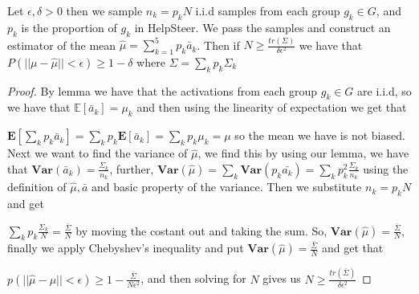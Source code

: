 \begin{theorem}
Let $\epsilon, \delta > 0$ then we sample $n_k=p_k N$ i.i.d samples from each group $g_k \in G$, and $p_k$
is the proportion of $g_k$ in HelpSteer. We pass the samples and construct an estimator of the mean
$\hat{ \mu}=\sum_{k=1}^{5}p_k \bar{a} _k$. Then if $N \geq \frac{tr(\Sigma)}{\delta \epsilon ^2}$ we have that
$P(||\mu - \hat{\mu}|| < \epsilon) \geq 1 - \delta$
where $\Sigma = \sum_k p_k \Sigma_k$
\end{theorem}
\begin{proof}
By lemma we have that the activations from each group $g _k \in G$ are i.i.d, so 
we have that $\mathbb{E} [\bar{a} _k] = \mu _k$ and then using the linearity of expectation we get that


$\mathbf{E}[\sum _k p_k \bar{a} _k]=\sum_k p_k \mathbf{E}[\bar{a} _k] = \sum_k p_k \mu _k=\mu$ so the
mean we have is not biased. Next we want to find the variance of $\hat{\mu}$, we find this by using
our lemma, we have that $\mathbf{Var}(\bar{a} _k)=\frac{\Sigma _k}{n _k}$, further, 
$\mathbf{Var}(\hat{\mu})= \sum _k \mathbf{Var}(p_k \bar{a _k})= \sum _k p_k^2\frac{\Sigma _k}{n _k}$ using
the definition of $\hat{\mu}, \bar{a}$ and basic property of the variance. Then we substitute $n_k = p_k N$
and get 

$\sum _k p_k \frac{\Sigma _k}{N}=\frac{\bar{\Sigma}}{N}$ by moving the costant out and taking the sum.
So, $\mathbf{Var}(\hat{\mu})=\frac{\bar{\Sigma}}{N}$, finally we apply Chebyshev's inequality
and put $\mathbf{Var}(\hat{\mu})=\frac{\bar{\Sigma}}{N}$ and get that 


$p(|| \hat{\mu} - \mu || < \epsilon ) \geq 1 - \frac{\bar{\Sigma}}{N \epsilon ^2}$,
and then solving for $N$ gives us $N \geq \frac{tr(\bar{ \Sigma })}{\delta \epsilon ^2}$


\end{proof}
